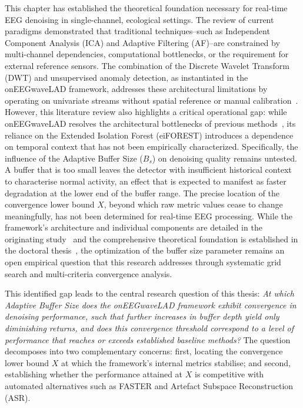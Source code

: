 \documentclass[MScCS,12pt,oneside,final]{uccthesis}
\begin{document}
    This chapter has established the theoretical foundation necessary for real-time EEG denoising in single-channel, ecological settings. The review of current paradigms demonstrated that traditional techniques--such as Independent Component Analysis (ICA) and Adaptive Filtering (AF)--are constrained by multi-channel dependencies, computational bottlenecks, or the requirement for external reference sensors. The combination of the Discrete Wavelet Transform (DWT) and unsupervised anomaly detection, as instantiated in the onEEGwaveLAD framework, addresses these architectural limitations by operating on univariate streams without spatial reference or manual calibration~\parencite{longo2025oneegwavelad}. However, this literature review also highlights a critical operational gap: while onEEGwaveLAD resolves the architectural bottlenecks of previous methods~\parencite{longo2026framework}, its reliance on the Extended Isolation Forest (eiFOREST) introduces a dependence on temporal context that has not been empirically characterized. Specifically, the influence of the Adaptive Buffer Size ($B_s$) on denoising quality remains untested. A buffer that is too small leaves the detector with insufficient historical context to characterise normal activity, an effect that is expected to manifest as faster degradation at the lower end of the buffer range. The precise location of the convergence lower bound $X$, beyond which raw metric values cease to change meaningfully, has not been determined for real-time EEG processing. While the framework's architecture and individual components are detailed in the originating study~\parencite{longo2025oneegwavelad} and the comprehensive theoretical foundation is established in the doctoral thesis~\parencite{longo2026framework}, the optimization of the buffer size parameter remains an open empirical question that this research addresses through systematic grid search and multi-criteria convergence analysis.
    
    This identified gap leads to the central research question of this thesis: \textit{At which Adaptive Buffer Size does the onEEGwaveLAD framework exhibit convergence in denoising performance, such that further increases in buffer depth yield only diminishing returns, and does this convergence threshold correspond to a level of performance that reaches or exceeds established baseline methods?} The question decomposes into two complementary concerns: first, locating the convergence lower bound $X$ at which the framework's internal metrics stabilise; and second, establishing whether the performance attained at $X$ is competitive with automated alternatives such as FASTER and Artefact Subspace Reconstruction (ASR).
    
\end{document}
